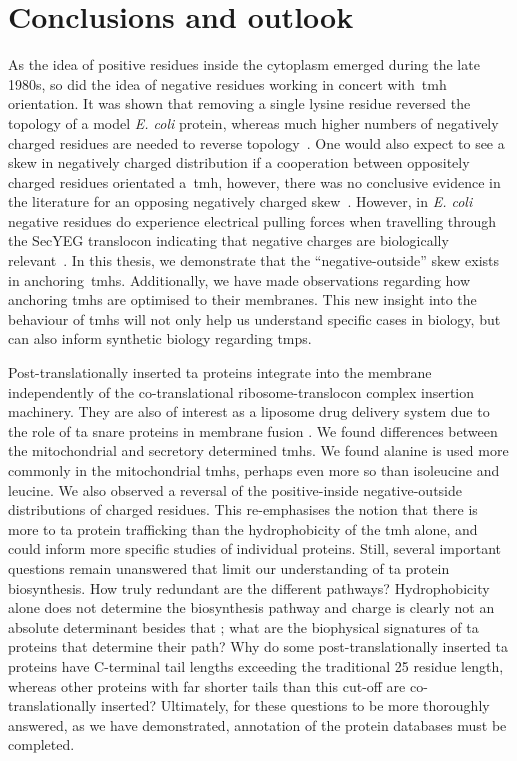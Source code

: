 \chapter{Conclusions and outlook}

\sloppy
As the idea of positive residues inside the cytoplasm emerged during the late 1980s, so did the idea of negative residues working in concert with~\gls{tmh} orientation.
It was shown that removing a single lysine residue reversed the topology of a model \textit{E. coli} protein, whereas much higher numbers of negatively charged residues are needed to reverse topology~\cite{Nilsson1990}.
One would also expect to see a skew in negatively charged distribution if a cooperation between oppositely charged residues orientated a~\gls{tmh}, however, there was no conclusive evidence in the literature for an opposing negatively charged skew~\cite{Granseth2005, Nilsson2005a, Sharpe2010, Baeza-Delgado2013, Pogozheva2013}.
However, in \textit{E. coli} negative residues do experience electrical pulling forces when travelling through the SecYEG translocon indicating that negative charges are biologically relevant~\cite{Ismail2015}.
In this thesis, we demonstrate that the ``negative\--outside'' skew exists in anchoring~\gls{tmh}s.
Additionally, we have made observations regarding how anchoring \gls{tmh}s are optimised to their membranes.
This new insight into the behaviour of \gls{tmh}s will not only help us understand specific cases in biology, but can also inform synthetic biology regarding \gls{tmp}s.

Post\--translationally inserted \gls{ta} proteins integrate into the membrane independently of the co\--translational ribosome\--translocon complex insertion machinery.
They are also of interest as a liposome drug delivery system due to the role of \gls{ta} \gls{snare} proteins in membrane fusion \cite{Ungar2003, Allen2013, Nordlund2014}.
We found differences between the mitochondrial and secretory determined \gls{tmh}s.
We found alanine is used more commonly in the mitochondrial \gls{tmh}s, perhaps even more so than isoleucine and leucine.
We also observed a reversal of the positive\--inside negative\--outside distributions of charged residues.
This re\--emphasises the notion that there is more to \gls{ta} protein trafficking than the hydrophobicity of the \gls{tmh} alone, and could inform more specific studies of individual proteins.
Still, several important questions remain unanswered that limit our understanding of \gls{ta} protein biosynthesis.
How truly redundant are the different pathways?
Hydrophobicity alone does not determine the biosynthesis pathway and charge is clearly not an absolute determinant besides that \cite{Guna2018}; what are the biophysical signatures of \gls{ta} proteins that determine their path?
Why do some post-translationally inserted \gls{ta} proteins have C-terminal tail lengths exceeding the traditional 25 residue length, whereas other proteins with far shorter tails than this cut-off are co-translationally inserted?
Ultimately, for these questions to be more thoroughly answered, as we have demonstrated, annotation of the protein databases must be completed.


